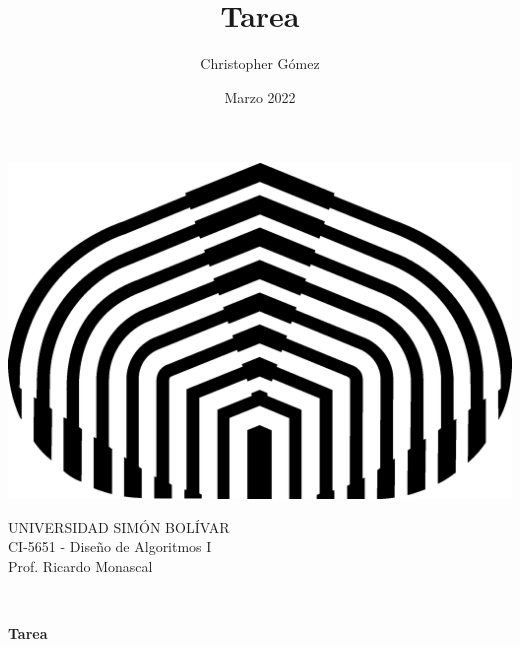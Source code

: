 \documentclass[letterpaper, 12pt]{article}
\title{Tarea}
\author{Christopher Gómez}
\date{Marzo 2022}
\begin{document}
\parbox[t]{.5\linewidth}{
    \centering
    \includegraphics[scale=0.4]{logo.png}
    \begin{center}
        UNIVERSIDAD SIMÓN BOLÍVAR \\
        CI-5651 - Diseño de Algoritmos I \\
        Prof. Ricardo Monascal \\
    \end{center}
}
\hfill {}

\phantom{This text will be invisible} \\
\centerline {\textbf{Tarea}}
\justify
\end{document}
